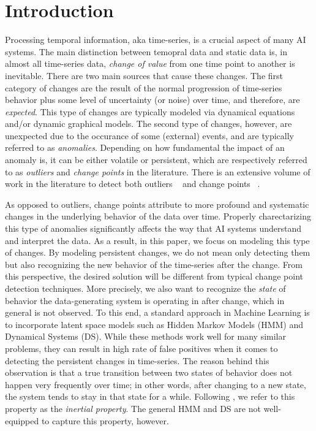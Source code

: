 \section{Introduction}

Processing temporal information, aka time-series, is a crucial aspect of many
AI systems. The main distinction between temopral data and static data is, 
in almost all time-series data, \emph{change of value} from one time point to
another is inevitable. There are two main sources that cause these changes. The
first category of changes are the result of the normal progression of
time-series behavior plus some level of uncertainty (or noise) over time, and
therefore, are \emph{expected}.
This type of changes are typically modeled via dynamical equations and/or dynamic
graphical models. The second type of changes, however, are unexpected due to the
occurance of some (external) events, and are typically referred to as
\emph{anomalies}. Depending on how fundamental the impact of an anomaly is, it
can be either volatile or persistent, which are respectively referred to as
\emph{outliers} and \emph{change points} in the literature. There
is an extensive volume of work in the literature to detect both outliers
~\cite{tsay1988outliers,chandola2009anomaly,galeano2006outlier} and change
points ~\cite{kawahara2007change,xie2013change,liu2013change,ray2002bayesian}.

As opposed to outliers, change points attribute to more profound and systematic
changes in the underlying behavior of the data over time. Properly
charectarizing this type of anomalies significantly affects the way that AI
systems understand and interpret the data. As a result, in this paper, we focus
on modeling this type of changes. By modeling persistent changes, we do not
mean only detecting them but also recognizing the new behavior of the
time-series after the change. From this perspective, the desired solution will
be different from typical change point detection techniques. More
precisely, we also want to recognize the \emph{state} of behavior the
data-generating system is operating in after change, which in general is not
observed.
To this end, a standard approach in Machine Learning is to incorporate latent space
models such as Hidden Markov Models (HMM) and Dynamical Systems (DS). While
these methods work well for many similar problems, they can result in high rate of
false positives when it comes to detecting the persistent changes in
time-series. The reason behind this observation is that a true transition
between two states of behavior does not happen very frequently over time; in
other words, after changing to a new state, the system tends to stay in that
state for a while. Following \cite{montanez_aaai_2015}, we refer to this
property as the \emph{inertial property}.
The general HMM and DS are not well-equipped to capture this property, however.

